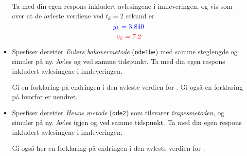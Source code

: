 \begin{itemize}
  Ta med din egen respons inkludert avlesingene i innleveringen, og
  vis som over at de avleste verdiene ved $t_{k}{=}2$ sekund er
  \begin{equation}
    {\color{blue}{y_{k}=3.840}}  
  \end{equation}
  \begin{equation}
  {\color{red}{v_{k}=7.2}}   
  \end{equation}
  
      

  \item 
    Spesfiser deretter {\it Eulers bakovermetode} ({\tt ode1be}) med
    samme steglengde og simuler på
    ny. Avles {\color{blue}} og
    {\color{red}}  ved samme tidspunkt.
    Ta med din egen respons inkludert avlesingene i innleveringen.

    Gi en forklaring på endringen i den avleste verdien for
    {\color{blue}}. Gi også en forklaring på hvorfor 
    {\color{red}} er uendret.


  \item 
    Spesfiser deretter {\it Heuns metode} ({\tt ode2}) som tilsvarer
    {\it trapesmetoden},  og simuler på
    ny. Avles igjen {\color{blue}} og
      {\color{red}}  ved samme tidspunkt.
    Ta med din egen respons inkludert avlesingene i innleveringen.

    Gi også her en forklaring på endringen i den avleste verdien for
    {\color{blue}}. 

\end{itemize}

